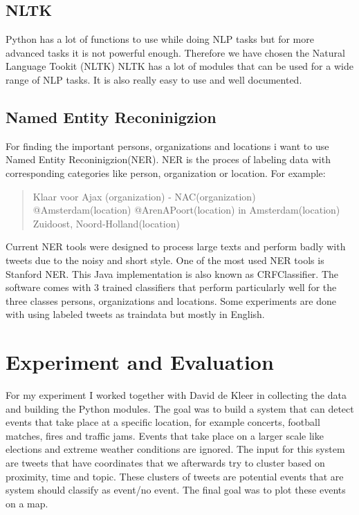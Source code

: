 \documentclass[
10pt, %
a4paper, %
oneside, %
headinclude,footinclude, %
BCOR5mm, %
]{scrartcl}
\begin{document}
\subsection{NLTK}
Python has a lot of functions to use while doing NLP tasks but for more advanced tasks it is not powerful enough. Therefore we have chosen the Natural Language Tookit (NLTK) %
NLTK has a lot of modules that can be used for a wide range of NLP tasks. It is also really easy to use and well documented. 




\subsection{Named Entity Reconinigzion}
For finding the important persons, organizations and locations i want to use Named Entity Reconinigzion(NER). NER is the proces of labeling data with corresponding categories like person, organization or location. For example:

\begin {quote}
Klaar voor Ajax (organization) - NAC(organization) @Amsterdam(location) @ArenAPoort(location) in Amsterdam(location) Zuidoost, Noord-Holland(location)
\end{quote}
Current NER tools were designed to process large texts and perform badly with tweets due to the noisy and short style. One of the most used NER tools is Stanford NER. This Java implementation is also known as CRFClassifier. The software comes with 3 trained classifiers that perform particularly well for the three classes persons, organizations and locations. Some experiments are done with using labeled tweets as traindata but mostly in English.  



\section{Experiment and Evaluation}
For my experiment I worked together with David de Kleer in collecting the data and building the Python modules. The goal was to build a system that can detect events that take place at a specific location, for example concerts, football matches, fires and traffic jams.  Events that take place on a larger scale like elections and extreme weather conditions are ignored. The input for this system are tweets that have coordinates that we afterwards try to cluster based on proximity, time and topic. These clusters of tweets are potential events that are system should classify as event/no event. The final goal was to plot these events on a map.
\end{document}
